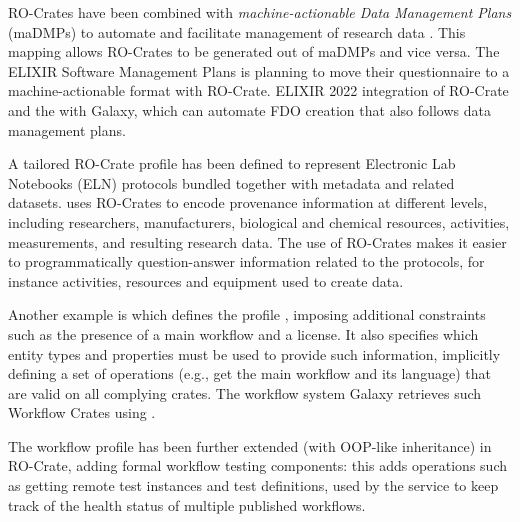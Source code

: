 RO-Crates have been combined with \emph{machine-actionable Data
Management Plans} (maDMPs) to automate and facilitate management of
research data \cite{Miksa 2020}. This mapping allows RO-Crates to be generated out of maDMPs
and vice versa. The ELIXIR Software Management Plans
\cite{Alves 2021} is
planning to move their questionnaire to a machine-actionable format with
RO-Crate. ELIXIR 
2022 
integration of RO-Crate and the  
\cite{Pergl 2019} with Galaxy, which can automate FDO creation that also follows
data management plans.

A tailored RO-Crate profile has been defined to represent Electronic Lab
Notebooks (ELN) protocols bundled together with metadata and related
datasets. \cite{Schröder 2022} uses RO-Crates to encode provenance information at different
levels, including researchers, manufacturers, biological and chemical
resources, activities, measurements, and resulting research data. The
use of RO-Crates makes it easier to programmatically question-answer
information related to the protocols, for instance activities, resources
and equipment used to create data.

Another example is 
\cite{Goble 2021} which
defines the
 profile
\cite{Bacall 2022}, imposing additional constraints such as the presence of a main
workflow and a license. It also specifies which entity types and
properties must be used to provide such information, implicitly defining
a set of operations (e.g., get the main workflow and its language) that
are valid on all complying crates. The workflow system Galaxy
\cite{Galaxy 2022} retrieves
such Workflow Crates using
.

The workflow profile has been further extended (with OOP-like
inheritance) in
RO-Crate, adding formal workflow testing components: this adds
operations such as getting remote test instances and test definitions,
used by the  service to
keep track of the health status of multiple published workflows.


